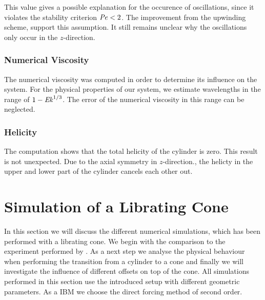 This value gives a possible explanation for the occurence of oscillations,
since it violates the stability criterion $\mbox{\textit{Pe}}<2$.
The improvement from the upwinding scheme, support this assumption.
It still remains unclear why the oscillations only occur in the $z$-direction.

\subsubsection{Numerical Viscosity}

The numerical viscosity was computed in order to determine its influence on the system.
For the physical properties of our system, we estimate wavelengths in the range of $1 - \mbox{\textit{Ek}}^{1/3}$.
The error of the numerical viscosity in this range can be neglected.

\subsubsection{Helicity}

The computation shows that the total helicity of the cylinder is zero.
This result is not unexpected.
Due to the axial symmetry in $z$-direction., the helicty in the upper and lower part of the cylinder cancels each other out.

\newpage

\section{Simulation of a Librating Cone}

In this section we will discuss the different numerical simulations, which has been performed
with a librating cone. We begin with the comparison to the experiment performed by \citep{Beardsley1970}.
As a next step we analyse the physical behaviour when performing the transition from a cylinder
to a cone and finally  we will investigate the influence of different offsets on top of the cone.
All simulations performed in this section use the introduced setup with different geometric parameters.
As a IBM we choose the direct forcing  method of second order.

